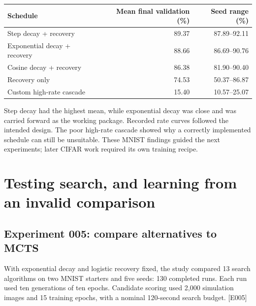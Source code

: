 \documentclass[11pt,a4paper]{article}
\newcommand{\ev}[1]{\textcolor{ink}{\small[#1]}}
\begin{document}
\begin{center}
\begin{tabular}{lrr}\toprule
Schedule & Mean final validation (\%) & Seed range (\%)\\\midrule
Step decay + recovery &89.37&87.89--92.11\\
Exponential decay + recovery &88.66&86.69--90.76\\
Cosine decay + recovery &86.38&81.90--90.40\\
Recovery only &74.53&50.37--86.87\\
Custom high-rate cascade &15.40&10.57--25.07\\\bottomrule
\end{tabular}
\end{center}

Step decay had the highest mean, while exponential decay was close and was carried forward as the working package. Recorded rate curves followed the intended design. The poor high-rate cascade showed why a correctly implemented schedule can still be unsuitable. These MNIST findings guided the next experiments; later CIFAR work required its own training recipe.

\newpage
\section{Testing search, and learning from an invalid comparison}
\subsection{Experiment 005: compare alternatives to MCTS}
With exponential decay and logistic recovery fixed, the study compared 13 search algorithms on two MNIST starters and five seeds: 130 completed runs. Each run used ten generations of ten epochs. Candidate scoring used 2,000 simulation images and 15 training epochs, with a nominal 120-second search budget. \ev{E005}

\begin{center}
\end{center}
\end{document}
